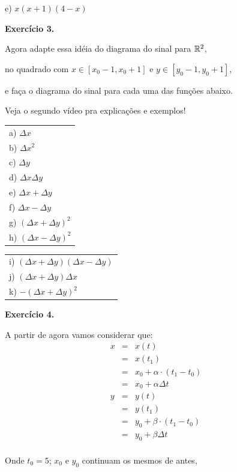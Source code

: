 \documentclass[oneside,12pt]{article}
\begin{document}
e) $x(x+1)(4-x)$

\newpage


{\bf Exercício 3.}

Agora adapte essa idéia do diagrama do sinal para $\mathbb{R}^2$,

no quadrado com $x∈[x_0-1,x_0+1]$ e $y∈[y_0-1,y_0+1]$,

e faça o diagrama do sinal para cada uma das funções abaixo.

Veja o segundo vídeo pra explicações e exemplos!

\msk

\begin{tabular}[t]{l}
a) $Δx$   \\
b) $Δx^2$ \\
c) $Δy$   \\
d) $ΔxΔy$ \\
e) $Δx+Δy$ \\
f) $Δx-Δy$ \\
g) $(Δx+Δy)^2$ \\
h) $(Δx-Δy)^2$ \\
\end{tabular}
\quad
\begin{tabular}[t]{l}
i) $(Δx+Δy)(Δx-Δy)$ \\
j) $(Δx+Δy)Δx$ \\
k) $-(Δx+Δy)^2$ \\
\end{tabular}


\newpage


{\bf Exercício 4.}

A partir de agora vamos considerar que:
%
$$\begin{array}{rcl}
  x &=& x(t) \\
    &=& x(t_1) \\
    &=& x_0 + α·(t_1-t_0) \\
    &=& x_0 + αΔt \\
  y &=& y(t) \\
    &=& y(t_1) \\
    &=& y_0 + β·(t_1-t_0) \\
    &=& y_0 + βΔt \\
  \end{array}
$$

Onde $t_0=5$; $x_0$ e $y_0$ continuam os mesmos de antes,
\end{document}
